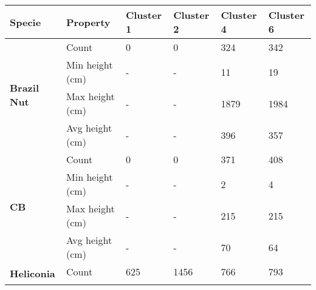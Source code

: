 \begin{table}[htb!]
  \centering
	    \begin{tabular}{|p{2cm}|p{2cm}|p{2cm}|p{2cm}|p{2cm}|p{2cm}|}
		\hline	
		\textbf{Specie} & \textbf{Property} & \textbf{Cluster 1} & \textbf{Cluster 2} & \textbf{Cluster 4} & \textbf{Cluster 6} \\
		\hline
		\multirow{4}{*}{\textbf{Brazil Nut}} & 
						\multicolumn{1}{l|}{Count} & 
						\multicolumn{1}{l|}{0} & 
						\multicolumn{1}{l|}{0} &
						\multicolumn{1}{l|}{324} & 
						\multicolumn{1}{l|}{342} \\\cline{2-6} &
						\multicolumn{1}{l|}{Min height (cm)} & 
						\multicolumn{1}{l|}{-} & 
						\multicolumn{1}{l|}{-} &
						\multicolumn{1}{l|}{11} & 
						\multicolumn{1}{l|}{19} \\\cline{2-6} &
						\multicolumn{1}{l|}{Max height (cm)} & 
						\multicolumn{1}{l|}{-} & 
						\multicolumn{1}{l|}{-} &
						\multicolumn{1}{l|}{1879} & 
						\multicolumn{1}{l|}{1984} \\\cline{2-6} &
						\multicolumn{1}{l|}{Avg height (cm)} & 
						\multicolumn{1}{l|}{-} & 
						\multicolumn{1}{l|}{-} &
						\multicolumn{1}{l|}{396} & 
						\multicolumn{1}{l|}{357} \\\cline{2-6}
		\hline       
		\multirow{4}{*}{\textbf{CB}} & 
						\multicolumn{1}{l|}{Count} & 
						\multicolumn{1}{l|}{0} & 
						\multicolumn{1}{l|}{0} &
						\multicolumn{1}{l|}{371} & 
						\multicolumn{1}{l|}{408} \\\cline{2-6} &
						\multicolumn{1}{l|}{Min height (cm)} & 
						\multicolumn{1}{l|}{-} & 
						\multicolumn{1}{l|}{-} &
						\multicolumn{1}{l|}{2} & 
						\multicolumn{1}{l|}{4} \\\cline{2-6} &
						\multicolumn{1}{l|}{Max height (cm)} & 
						\multicolumn{1}{l|}{-} & 
						\multicolumn{1}{l|}{-} &
						\multicolumn{1}{l|}{215} & 
						\multicolumn{1}{l|}{215} \\\cline{2-6} &
						\multicolumn{1}{l|}{Avg height (cm)} & 
						\multicolumn{1}{l|}{-} & 
						\multicolumn{1}{l|}{-} &
						\multicolumn{1}{l|}{70} & 
						\multicolumn{1}{l|}{64} \\\cline{2-6}
		\hline      
		\multirow{4}{*}{\textbf{Heliconia}} & 
						\multicolumn{1}{l|}{Count} & 
						\multicolumn{1}{l|}{625} & 
						\multicolumn{1}{l|}{1456} &
						\multicolumn{1}{l|}{766} & 
						\multicolumn{1}{l|}{793} \\\cline{2-6} &

\end{tabular}
\end{table}
